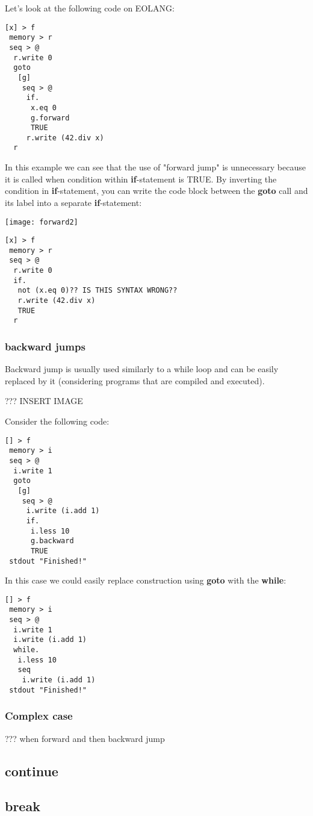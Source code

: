 \documentclass[two column]{article}
\begin{document}
Let's look at the following code on EOLANG:
\begin{lstlisting}
[x] > f
 memory > r
 seq > @
  r.write 0
  goto
   [g]
    seq > @
     if.
      x.eq 0
      g.forward
      TRUE
     r.write (42.div x)
  r
\end{lstlisting}

In this example we can see that the use of "forward jump" is unnecessary because it is called when condition within \textbf{if}-statement is TRUE. By inverting the condition in \textbf{if}-statement, you can write the code block between the \textbf{goto} call and its label into a separate \textbf{if}-statement:

\texttt{[image: forward2]}

\begin{lstlisting}
[x] > f
 memory > r
 seq > @
  r.write 0
  if.
   not (x.eq 0)?? IS THIS SYNTAX WRONG??
   r.write (42.div x)
   TRUE
  r
\end{lstlisting}

\subsubsection{backward jumps}
Backward jump is usually used similarly to a while loop and can be easily replaced by it (considering programs that are compiled and executed).


??? INSERT IMAGE

Consider the following code:
\begin{lstlisting}
[] > f
 memory > i
 seq > @
  i.write 1
  goto
   [g]
    seq > @
     i.write (i.add 1)
     if.
      i.less 10
      g.backward
      TRUE
 stdout "Finished!"
\end{lstlisting}


In this case we could easily replace construction using \textbf{goto} with the \textbf{while}:
\begin{lstlisting}
[] > f
 memory > i
 seq > @
  i.write 1
  i.write (i.add 1)
  while.
   i.less 10
   seq
    i.write (i.add 1)
 stdout "Finished!"
\end{lstlisting}



\subsubsection{Complex case}
??? when forward and then backward jump


\subsection{continue}

\subsection{break}
\end{document}
